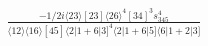 \documentclass[varwidth, border=5pt]{standalone}
\begin{document}
\begin{my}
$\begin{gathered}
\scriptscriptstyle\frac{-1/2i\langle23\rangle[23]\langle26\rangle^4[34]^3s_{345}^4}{\langle12\rangle\langle16\rangle[45]\langle2|1+6|3]^4\langle2|1+6|5]\langle6|1+2|3]}
\end{gathered}$
\end{my}
\end{document}
